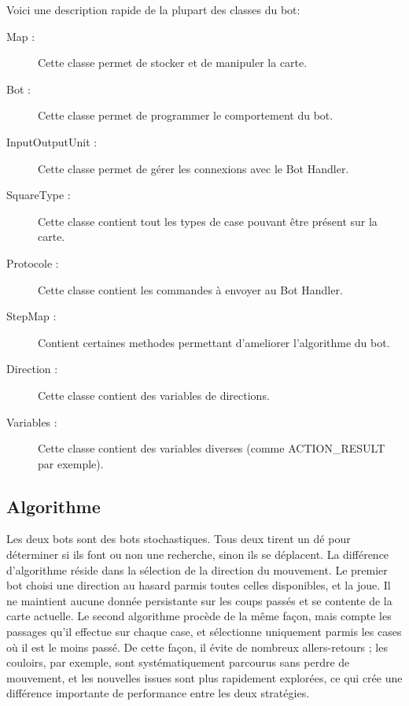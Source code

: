 Voici une description rapide de la plupart des classes du bot:

\begin{description}
\item[Map :] Cette classe permet de stocker et de manipuler la carte.
\item[Bot :] Cette classe permet de programmer le comportement du bot.
\item[InputOutputUnit :] Cette classe permet de gérer les connexions avec le Bot Handler.
\item[SquareType :] Cette classe contient tout les types de case pouvant être présent sur la carte.
\item[Protocole :] Cette classe contient les commandes à envoyer au Bot Handler.
\item[StepMap :] Contient certaines methodes permettant d'ameliorer l'algorithme du bot.
\item[Direction :] Cette classe contient des variables de directions.
\item[Variables :] Cette classe contient des variables diverses (comme ACTION\_RESULT par exemple).
\end{description} 

\subsection{Algorithme}

Les deux bots sont des bots stochastiques. Tous deux tirent un dé pour déterminer si ils font ou non une recherche, sinon ils se déplacent. La différence d'algorithme réside dans la sélection de la direction du mouvement. Le premier bot choisi une direction au hasard parmis toutes celles disponibles, et la joue. Il ne maintient aucune donnée persistante sur les coups passés et se contente de la carte actuelle. Le second algorithme procède de la même façon, mais compte les passages qu'il effectue sur chaque case, et sélectionne uniquement parmis les cases où il est le moins passé. De cette façon, il évite de nombreux allers-retours ; les couloirs, par exemple, sont systématiquement parcourus sans perdre de mouvement, et les nouvelles issues sont plus rapidement explorées, ce qui crée une différence importante de performance entre les deux stratégies. 

\subsection{}
